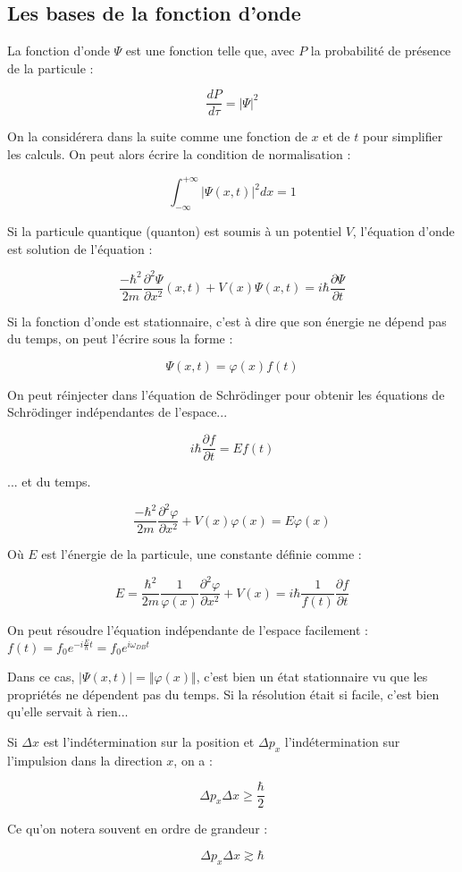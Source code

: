 \documentclass[a4paper,12pt]{book}
\newcommand{\Def}[2]{\begin{tcolorbox}[colback=white,colframe=red!10!green!20!blue!75!, title=Définition : #1]#2\end{tcolorbox}}
\newcommand{\Thr}[2]{\begin{tcolorbox}[sharp corners, colback=white,colframe=red!10!blue!30!green!75!, title=Théorème : #1]#2\end{tcolorbox}}
\begin{document}
\subsection{Les bases de la fonction d'onde}
\Def{Fonction d'onde}{La fonction d'onde $\Psi$ est une fonction telle que, avec $P$ la probabilité de présence de la particule :
\par $$\frac{dP}{d\tau} = \vert\Psi\vert^2$$
\par On la considérera dans la suite comme une fonction de $x$ et de $t$ pour simplifier les calculs. On peut alors écrire la condition de normalisation :
\par $$\int_{-\infty}^{+\infty}\vert\Psi(x,t)\vert^2dx =1$$}
\Thr{L'équation de Schrödinger}{Si la particule quantique (quanton) est soumis à un potentiel $V$, l'équation d'onde est solution de l'équation :
\par $$\frac{-\hbar^2}{2m}\dfrac{\partial^2\Psi}{\partial x^2}(x,t)+V(x)\Psi(x,t)=i\hbar\dfrac{\partial\Psi}{\partial t}$$}
\Thr{Solution stationnaire}{Si la fonction d'onde est stationnaire, c'est à dire que son énergie ne dépend pas du temps, on peut l'écrire sous la forme :
\par $$\Psi(x,t) = \varphi(x)f(t)$$
\par On peut réinjecter dans l'équation de Schrödinger pour obtenir les équations de Schrödinger indépendantes de l'espace...
\par $$i\hbar\dfrac{\partial f}{\partial t} = Ef(t)$$
\par ... et du temps.
\par $$\frac{-\hbar^2}{2m}\dfrac{\partial^2\varphi}{\partial x^2} + V(x)\varphi(x)=E\varphi(x)$$
\par Où $E$ est l'énergie de la particule, une constante définie comme :
\par $$E = \frac{\hbar^2}{2m}\frac{1}{\varphi(x)}\dfrac{\partial^2\varphi}{\partial x^2} +V(x) = i\hbar\frac{1}{f(t)}\dfrac{\partial f}{\partial t}$$}
On peut résoudre l'équation indépendante de l'espace facilement : $f(t) = f_0e^{-i\frac{E}{\hbar}t} = f_0e^{i\omega_{DB}t}$
\par Dans ce cas, $\vert\Psi(x,t)\vert=\Vert\varphi(x)\Vert$, c'est bien un état stationnaire vu que les propriétés ne dépendent pas du temps. Si la résolution était si facile, c'est bien qu'elle servait à rien...
\Thr{Indétermination d'Heisenberg}{Si $\Delta x$ est l'indétermination sur la position et $\Delta p_x$ l'indétermination sur l'impulsion dans la direction $x$, on a :
\par $$\Delta p_x\Delta x\geq\frac{\hbar}{2}$$
\par Ce qu'on notera souvent en ordre de grandeur :
\par $$\Delta p_x\Delta x\gtrsim \hbar$$}
\end{document}
